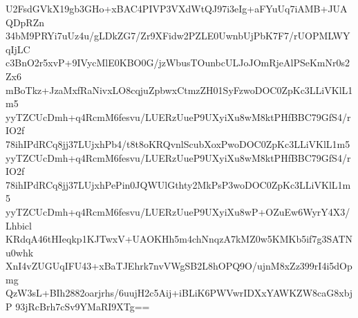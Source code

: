 U2FsdGVkX19gb3GHo+xBAC4PIVP3VXdWtQJ97i3eIg+aFYuUq7iAMB+JUAQDpRZn
34bM9PRYi7uUz4u/gLDkZG7/Zr9XFidw2PZLE0UwnbUjPbK7F7/rUOPMLWYqIjLC
c3BnO2r5xvP+9IVycMlE0KBO0G/jzWbusTOunbcULJoJOmRjeAlPSeKmNr0s2Zx6
mBoTkz+JzaMxfRaNivxLO8cqjuZpbwxCtmzZH01SyFzwoDOC0ZpKc3LLiVKlL1m5
yyTZCUcDmh+q4RcmM6fesvu/LUERzUueP9UXyiXu8wM8ktPHfBBC79GfS4/rIO2f
78ihIPdRCq8jj37LUjxhPb4/t8t8oKRQvnlScubXoxPwoDOC0ZpKc3LLiVKlL1m5
yyTZCUcDmh+q4RcmM6fesvu/LUERzUueP9UXyiXu8wM8ktPHfBBC79GfS4/rIO2f
78ihIPdRCq8jj37LUjxhPePin0JQWUlGthty2MkPsP3woDOC0ZpKc3LLiVKlL1m5
yyTZCUcDmh+q4RcmM6fesvu/LUERzUueP9UXyiXu8wP+OZuEw6WyrY4X3/Lhbicl
KRdqA46tHIeqkp1KJTwxV+UAOKHh5m4chNnqzA7kMZ0w5KMKb5if7g3SATNu0whk
XnI4vZUGUqIFU43+xBaTJEhrk7nvVWgSB2L8hOPQ9O/ujnM8xZz399rI4i5dOpmg
QzW3sL+BIh2882oarjrhs/6uujH2c5Aij+iBLiK6PWVwrIDXxYAWKZW8caG8xbjP
93jRcBrh7cSv9YMaRI9XTg==
